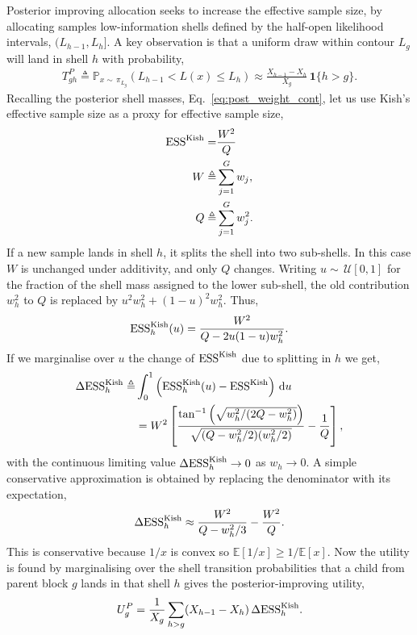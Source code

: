 \documentclass[pdflatex,sn-basic,icol]{sn-jnl}
\newcommand{\dd}{\mathrm{d}}
\newcommand{\E}{\mathbb{E}}
\newcommand{\Prob}{\mathbb{P}}
\theoremstyle{plain}
\theoremstyle{definition}
\begin{document}
\begin{appendices}
Posterior improving allocation seeks to increase the effective sample size, by allocating samples low-information shells defined by the half-open likelihood intervals, $(L_{h-1}, L_h]$.
A key observation is that a uniform draw within contour $L_g$ will land in shell $h$ with probability,
\begin{align}
    T^P_{g h}
    \triangleq
    \Prob_{x\sim\,\pi_{L_{g}}}(L_{h-1} < L(x) \le L_h)
    \approx \frac{ X_{h-1} -  X_{h}}{ X_g} \,\mathbf{1}\{h>g\}.
\end{align}
Recalling the posterior shell masses, Eq.~\ref{eq:post_weight_cont}, let us use Kish's effective sample size as a proxy for effective sample size,
\begin{align}
    \mathrm{ESS}^{\rm Kish} =& \frac{W^2}{Q}\\
    W\triangleq& \sum_{j=1}^{G} w_j,\\
    Q\triangleq& \sum_{j=1}^{G} w_j^2.
\end{align}
If a new sample lands in shell $h$, it splits the shell into two sub-shells.
In this case $W$ is unchanged under additivity, and only $Q$ changes.
Writing $u\sim\,\mathcal{U}[0, 1]$ for the fraction of the shell mass assigned to the lower sub-shell, the old contribution $w_h^2$ to $Q$ is replaced by $u^2 w_h^2+(1-u)^2 w_h^2$.
Thus,
\begin{align}
    \mathrm{ESS}^{\rm Kish}_{h}(u)
    =\frac{W^2}{Q - 2u(1-u)w_h^2}.
\end{align}
If we marginalise over $u$ the change of $\mathrm{ESS}^{\rm Kish}$ due to splitting in $h$ we get,
\begin{align}
    \Delta\mathrm{ESS}^{\rm Kish}_h
    \triangleq&
    \int_0^1
    \left(\mathrm{ESS}^{\rm Kish}_h(u)-\mathrm{ESS}^{\rm Kish}\right)\,\dd u \\
    &=
    W^2\left[
    \frac{
    \tan^{-1}\left(\sqrt{w_h^2/(2Q-w_h^2)}\right)
    }
    {\sqrt{(Q-w_h^2/2)(w_h^2/2)}}
    -\frac{1}{Q}
    \right],
    \label{eq:posterior_shell_value}
\end{align}
with the continuous limiting value $\Delta\mathrm{ESS}^{\rm Kish}_h \to 0$ as $w_h \to 0$.
A simple conservative approximation is obtained by replacing the denominator with its expectation,
\begin{align}
    \Delta\mathrm{ESS}^{\rm Kish}_h
    \approx
    \frac{W^2}{Q - w_h^2/3} - \frac{W^2}{Q}.
\end{align}
This is conservative because $1/x$ is convex so $\E[1/x] \ge 1/\E[x]$.
Now the utility is found by marginalising over the shell transition probabilities that a child from parent block $g$ lands in that shell $h$ gives the posterior-improving utility,
\begin{align}
    U^P_g
    =
    \frac{1}{X_g}\sum_{h > g}
     (X_{h-1}- X_h)\,\Delta\mathrm{ESS}^{\rm Kish}_h .
    \label{eq:posterior_improving_utility}
\end{align}

\end{appendices}


\end{document}
